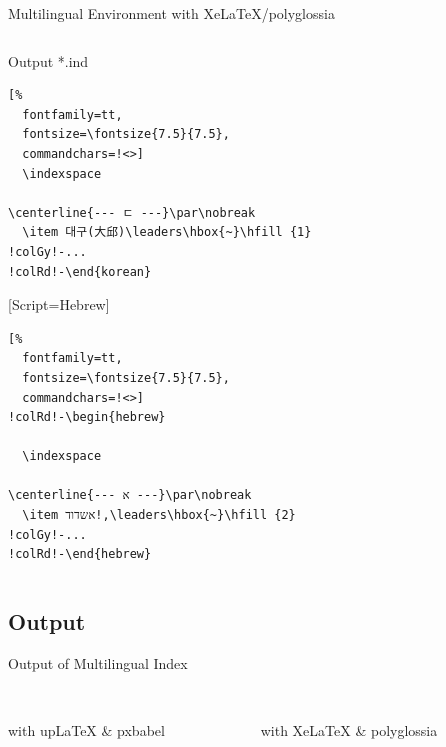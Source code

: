 \documentclass[aspectratio=169,10pt]{beamer}
\begin{document}
\begin{frame}[fragile]{Multilingual Environment with XeLaTeX/polyglossia}
\begin{columns}
\begin{column}{64mm}
\begin{exampleblock}{Output *.ind}
\begin{Verbatim}[%
  fontfamily=tt,
  fontsize=\fontsize{7.5}{7.5},
  commandchars=!<>]
  \indexspace

\centerline{--- ㄷ ---}\par\nobreak
  \item 대구(大邱)\leaders\hbox{~}\hfill {1}
!colGy!-...
!colRd!-\end{korean}
\end{Verbatim}
\setsansfont{SILEOT.ttf}
\setmonofont{DejaVu Sans}[Script=Hebrew]
\begin{hebrew}
\begin{Verbatim}[%
  fontfamily=tt,
  fontsize=\fontsize{7.5}{7.5},
  commandchars=!<>]
!colRd!-\begin{hebrew}

  \indexspace

\centerline{--- א ---}\par\nobreak
  \item אשדוד!,\leaders\hbox{~}\hfill {2}
!colGy!-...
!colRd!-\end{hebrew}
\end{Verbatim}
\end{hebrew}
\end{exampleblock}
\end{column}
\end{columns}

\end{frame}


\subsection{Output}
\begin{frame}[fragile]{Output of Multilingual Index}
\begin{columns}

\begin{column}{60mm}
\begin{center}
\\[1mm]%
\footnotesize with upLaTeX \& pxbabel
\end{center}
\end{column}

\begin{column}{60mm}
\begin{center}
\\[1mm]%
\footnotesize with XeLaTeX \& polyglossia
\end{center}
\end{column}
\end{columns}

\end{frame}
\end{document}
